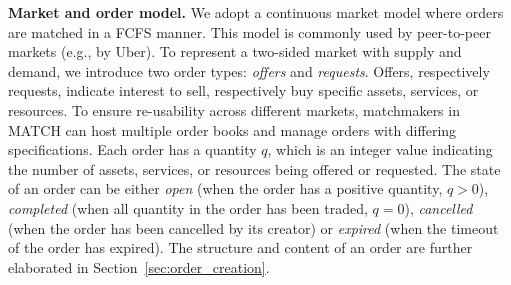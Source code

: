 \textbf{Market and order model.}
We adopt a continuous market model where orders are matched in a FCFS manner.
This model is commonly used by peer-to-peer markets (e.g., by Uber).
To represent a two-sided market with supply and demand, we introduce two order types: \emph{offers} and \emph{requests}.
Offers, respectively requests, indicate interest to sell, respectively buy specific assets, services, or resources.
To ensure re-usability across different markets, matchmakers in MATCH can host multiple order books and manage orders with differing specifications.
Each order has a quantity $ q $, which is an integer value indicating the number of assets, services, or resources being offered or requested.
The state of an order can be either \emph{open} (when the order has a positive quantity, $ q > 0 $), \emph{completed} (when all quantity in the order has been traded, $ q = 0 $), \emph{cancelled} (when the order has been cancelled by its creator) or \emph{expired} (when the timeout of the order has expired).
The structure and content of an order are further elaborated in Section~\ref{sec:order_creation}.

